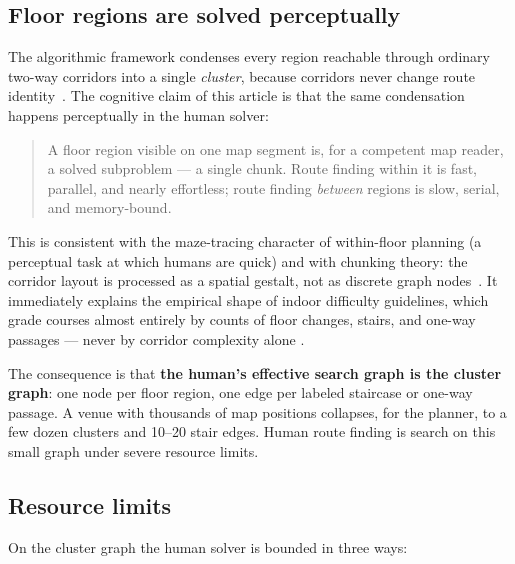 \documentclass[11pt,a4paper,twocolumn]{article}
\begin{document}
\subsection{Floor regions are solved perceptually}

The algorithmic framework condenses every region reachable through ordinary
two-way corridors into a single \emph{cluster}, because corridors never
change route identity~\cite{framework}. The cognitive claim of this article
is that the same condensation happens perceptually in the human solver:

\begin{quote}
A floor region visible on one map segment is, for a competent map reader, a
solved subproblem --- a single chunk. Route finding within it is fast,
parallel, and nearly effortless; route finding \emph{between} regions is
slow, serial, and memory-bound.
\end{quote}

This is consistent with the maze-tracing character of within-floor planning
(a perceptual task at which humans are quick) and with chunking theory: the
corridor layout is processed as a spatial gestalt, not as discrete graph
nodes~\cite{chase1973}. It immediately explains the empirical shape of indoor
difficulty guidelines, which grade courses almost entirely by counts of floor
changes, stairs, and one-way passages --- never by corridor complexity alone
\cite{framework}.

The consequence is that \textbf{the human's effective search graph is the
cluster graph}: one node per floor region, one edge per labeled staircase or
one-way passage. A venue with thousands of map positions collapses, for the
planner, to a few dozen clusters and 10--20 stair edges. Human route finding
is search on this small graph under severe resource limits.

\subsection{Resource limits}

On the cluster graph the human solver is bounded in three ways:
\end{document}
